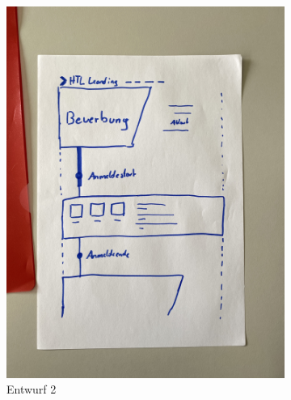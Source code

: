 \begin{figure}
\begin{subfigure}{0.3\textwidth}
     \includegraphics[width=\textwidth, angle=270]{pics/Entwurf_Beispiel_2.JPG}
     \caption{Entwurf 2}
     \label{fig:b}
   \end{subfigure}
   \hfill
   \begin{subfigure}{0.3\textwidth}

\end{subfigure}
\end{figure}
